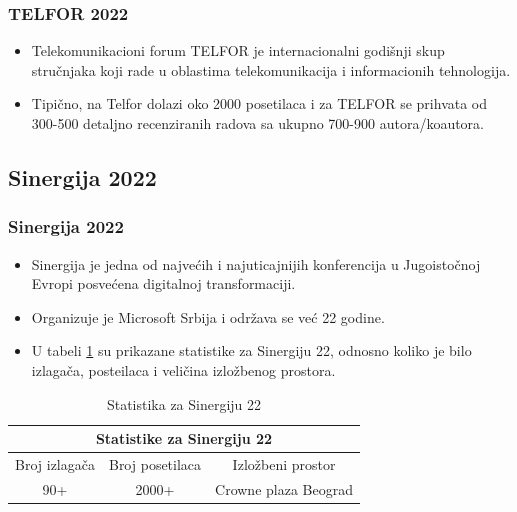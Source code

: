 \documentclass{beamer}
\begin{document}
\begin{frame}[fragile]\frametitle{TELFOR 2022}
	\begin{itemize}	
		\item Telekomunikacioni forum TELFOR je internacionalni godišnji skup stručnjaka koji rade u oblastima telekomunikacija i informacionih tehnologija.
		\item Tipično, na Telfor dolazi oko 2000 posetilaca i za TELFOR se prihvata od 300-500 detaljno recenziranih radova sa ukupno 700-900 autora/koautora.
	\end{itemize}
\end{frame}


\subsection{Sinergija 2022}
\begin{frame}[fragile]\frametitle{Sinergija 2022}
\begin{itemize}
    \item Sinergija je jedna od najvećih i najuticajnijih konferencija u Jugoistočnoj Evropi posvećena digitalnoj transformaciji.
    \item Organizuje je Microsoft Srbija i održava se već 22 godine.
    \item U tabeli \ref{tab:tabela1} su prikazane statistike za Sinergiju 22, odnosno koliko je bilo izlagača, posteilaca i veličina izložbenog prostora.
\end{itemize}
\begin{table}[h!]
\begin{center}
\begin{tabular}{|ccc|} \hline
\multicolumn{3}{|c|}{Statistike za Sinergiju 22}                                                                  \\ \hline
\multicolumn{1}{|c|}{Broj izlagača} & \multicolumn{1}{c|}{Broj posetilaca}          & Izložbeni prostor          \\ \hline
\multicolumn{1}{|c|}{90+}      & \multicolumn{1}{c|}{2000+} &  Crowne plaza Beograd \\ \hline
\end{tabular}
\caption{Statistika za Sinergiju 22}
\label{tab:tabela1}
\end{center}
\end{table}

\end{frame}
\end{document}
